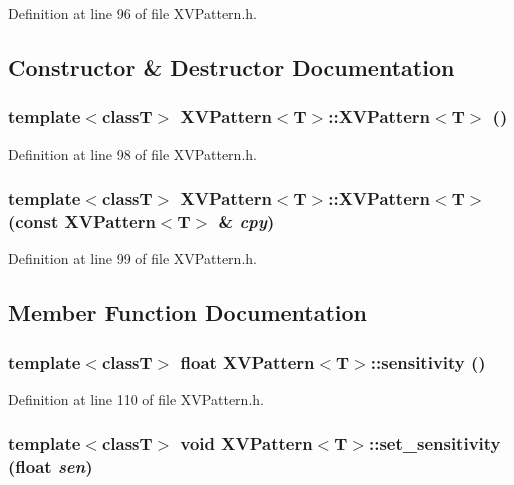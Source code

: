 Definition at line 96 of file XVPattern.h.

\subsection{Constructor \& Destructor Documentation}
\label{XVPattern_a0}
\hypertarget{class_XVPattern_a0}{
\subsubsection[XVPattern]{\setlength{\rightskip}{0pt plus 5cm}template$<$classT$>$ XVPattern$<$T$>$::XVPattern$<$T$>$ ()}}




Definition at line 98 of file XVPattern.h.\label{XVPattern_a1}
\hypertarget{class_XVPattern_a1}{
\subsubsection[XVPattern]{\setlength{\rightskip}{0pt plus 5cm}template$<$classT$>$ XVPattern$<$T$>$::XVPattern$<$T$>$ (const XVPattern$<$T$>$ \& {\em cpy})}}




Definition at line 99 of file XVPattern.h.

\subsection{Member Function Documentation}
\label{XVPattern_a5}
\hypertarget{class_XVPattern_a5}{
\subsubsection[sensitivity]{\setlength{\rightskip}{0pt plus 5cm}template$<$classT$>$ float XVPattern$<$T$>$::sensitivity ()}}




Definition at line 110 of file XVPattern.h.\label{XVPattern_a6}
\hypertarget{class_XVPattern_a6}{
\subsubsection[set_sensitivity]{\setlength{\rightskip}{0pt plus 5cm}template$<$classT$>$ void XVPattern$<$T$>$::set\_\-sensitivity (float {\em sen})}}




